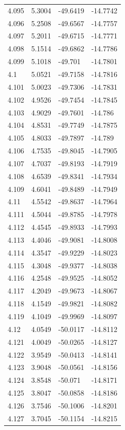 \begin{tabular}{llll}
4.095 & 5.3004 & -49.6419 & -14.7742 \\
4.096 & 5.2508 & -49.6567 & -14.7757 \\
4.097 & 5.2011 & -49.6715 & -14.7771 \\
4.098 & 5.1514 & -49.6862 & -14.7786 \\
4.099 & 5.1018 & -49.701 & -14.7801 \\
4.1 & 5.0521 & -49.7158 & -14.7816 \\
4.101 & 5.0023 & -49.7306 & -14.7831 \\
4.102 & 4.9526 & -49.7454 & -14.7845 \\
4.103 & 4.9029 & -49.7601 & -14.786 \\
4.104 & 4.8531 & -49.7749 & -14.7875 \\
4.105 & 4.8033 & -49.7897 & -14.789 \\
4.106 & 4.7535 & -49.8045 & -14.7905 \\
4.107 & 4.7037 & -49.8193 & -14.7919 \\
4.108 & 4.6539 & -49.8341 & -14.7934 \\
4.109 & 4.6041 & -49.8489 & -14.7949 \\
4.11 & 4.5542 & -49.8637 & -14.7964 \\
4.111 & 4.5044 & -49.8785 & -14.7978 \\
4.112 & 4.4545 & -49.8933 & -14.7993 \\
4.113 & 4.4046 & -49.9081 & -14.8008 \\
4.114 & 4.3547 & -49.9229 & -14.8023 \\
4.115 & 4.3048 & -49.9377 & -14.8038 \\
4.116 & 4.2548 & -49.9525 & -14.8052 \\
4.117 & 4.2049 & -49.9673 & -14.8067 \\
4.118 & 4.1549 & -49.9821 & -14.8082 \\
4.119 & 4.1049 & -49.9969 & -14.8097 \\
4.12 & 4.0549 & -50.0117 & -14.8112 \\
4.121 & 4.0049 & -50.0265 & -14.8127 \\
4.122 & 3.9549 & -50.0413 & -14.8141 \\
4.123 & 3.9048 & -50.0561 & -14.8156 \\
4.124 & 3.8548 & -50.071 & -14.8171 \\
4.125 & 3.8047 & -50.0858 & -14.8186 \\
4.126 & 3.7546 & -50.1006 & -14.8201 \\
4.127 & 3.7045 & -50.1154 & -14.8215 \\

\end{tabular}
